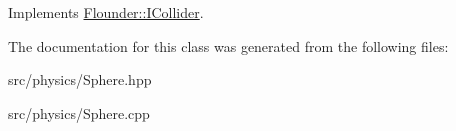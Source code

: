 Implements \hyperlink{class_flounder_1_1_i_collider_aee68579a002a36bd19417b78c5c29871}{Flounder\+::\+I\+Collider}.



The documentation for this class was generated from the following files\+:\begin{DoxyCompactItemize}
\item 
src/physics/Sphere.\+hpp\item 
src/physics/Sphere.\+cpp\end{DoxyCompactItemize}
